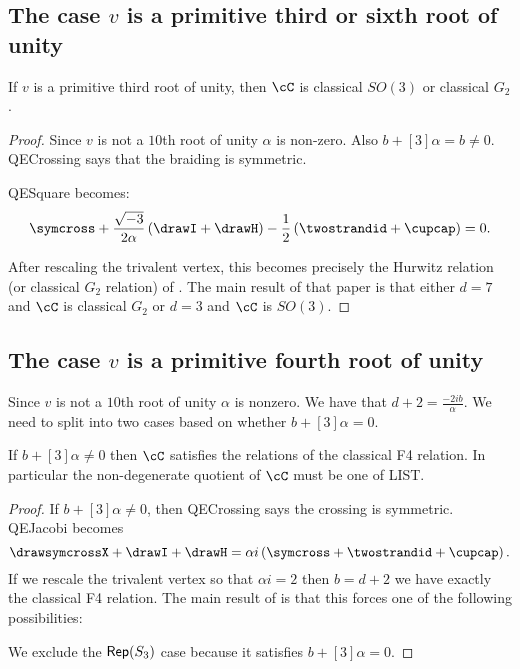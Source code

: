 \documentclass[12pt]{amsart}
\begin{document}
\subsection{The case $v$ is a primitive third or sixth root of unity}

\begin{proposition}
If $v$ is a primitive third root of unity, then $\cC$ is classical $SO(3)$ or classical $G_2$.
\end{proposition}
\begin{proof}
Since $v$ is not a $10$th root of unity $\alpha$ is non-zero.  Also $b+[3]\alpha = b \neq 0$.  QECrossing says that the braiding is symmetric.  

QESquare becomes:
$$\symcross+\frac{\sqrt{-3}}{2\alpha} \left(\drawI + \drawH \right) -\frac{1}{2} \left(\twostrandid + \cupcap \right) = 0.$$

After rescaling the trivalent vertex, this becomes precisely the Hurwitz relation (or classical $G_2$ relation) of \cite{???}.  The main result of that paper is that either $d = 7$ and $\cC$ is classical $G_2$ or $d=3$ and $\cC$ is $SO(3)$.
\end{proof}

\subsection{The case $v$ is a primitive fourth root of unity}

Since $v$ is not a $10$th root of unity $\alpha$ is nonzero.  We have that $d+2 = \frac{-2ib}{\alpha}$.
We need to split into two cases based on whether $b+[3]\alpha = 0$.  

\begin{proposition}
If $b+[3]\alpha \neq 0$ then $\cC$ satisfies the relations of the classical F4 relation.  In particular the non-degenerate quotient of $\cC$ must be one of LIST.
\end{proposition}
\begin{proof}
If $b+[3]\alpha \neq 0$, then QECrossing says the crossing is symmetric.   QEJacobi becomes
$$\drawsymcrossX + \drawI + \drawH = \alpha i \left(\symcross + \twostrandid + \cupcap \right).$$  If we rescale the trivalent vertex so that $\alpha i = 2$ then $b = d+2$ we have exactly the classical F4 relation.  The main result of \cite{???} is that this forces one of the following possibilities:


We exclude the $\operatorname{\mathsf{Rep}}(S_3)$ case because it satisfies $b+[3]\alpha = 0$.
\end{proof}
\end{document}
